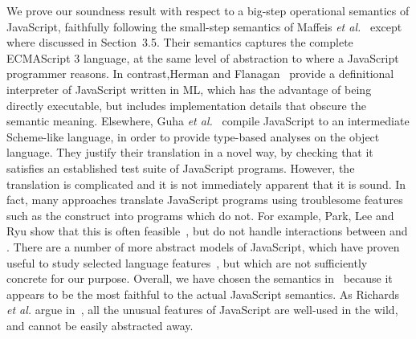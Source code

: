 \documentclass{article}
\begin{document}






We prove our soundness result with respect to a big-step operational semantics of JavaScript,  faithfully following the small-step semantics of  Maffeis \emph{et al.}~\cite{MMT-APLAS-TR08} except where discussed in Section~3.5.
%
Their semantics captures the  complete ECMAScript 3 language, at the same level of abstraction to where a JavaScript programmer reasons.
%
In contrast,Herman and Flanagan~\cite{HermanFlanagan} provide a definitional interpreter of JavaScript written in ML, which has the advantage of being directly executable, but includes implementation details that obscure the semantic meaning. 
Elsewhere, Guha \emph{et al.}~\cite{Guha2010} compile JavaScript to
an intermediate Scheme-like language, in order to provide type-based
analyses on the object language. They justify their translation in a
novel way, by checking that it satisfies an established test suite of
JavaScript programs. However, the translation is complicated and it is
not immediately apparent that it is sound.
%
In fact, many approaches  translate JavaScript programs using  troublesome
features such as the  construct into programs which do not.
For example, Park, Lee and Ryu show that this is often feasible~\cite{RyuFOOL2011},
but do not handle interactions between  and .
%
There are  a number of more abstract models of JavaScript, which have proven useful to study selected language features~\cite{YuChander07,Giannini,ThiemannE}, but which are not sufficiently concrete for our purpose. 
%
Overall, we have chosen the semantics in~\cite{MMT-APLAS-TR08} because
it appears to be the most faithful to the actual JavaScript semantics.
%
As Richards {\em et al.} argue in~\cite{Richards2010}, all the unusual features of JavaScript are well-used in the wild, and cannot be easily abstracted away. 
\end{document}
